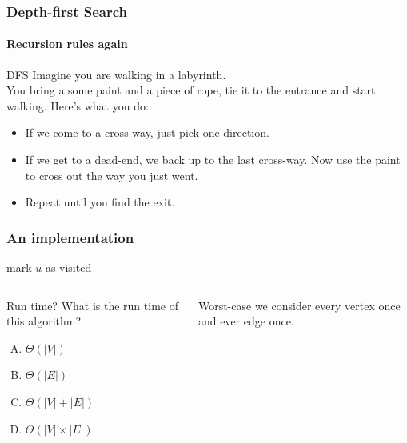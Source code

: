 \begin{frame}
	\frametitle{Depth-first Search}
	\framesubtitle{Recursion rules again}

		\begin{block}{DFS}
			Imagine you are walking in a labyrinth.\\
			\pause
			You bring a some paint and a piece of rope, tie it to the entrance and start walking. Here's what you do:\\
			\pause
			\begin{itemize}
				\item If we come to a cross-way, just pick one direction.
					\pause
				\item If we get to a dead-end, we back up to the last cross-way. Now use the paint to cross out the way you just
					went.
					\pause
				\item Repeat until you find the exit.
			\end{itemize}
		\end{block}	
	
\end{frame}

\begin{frame}
	\frametitle{An implementation}
	
	\begin{algorithmic}
	\pause
	\pause
		\State mark $u$ as visited
	\pause
		\State{}
		\EndIf
		\EndFor
		\EndFunction
	\end{algorithmic}
	\pause
	\begin{columns}
	\begin{block}{Run time?}
		What is the run time of this algorithm?
		\begin{enumerate}[A.]
			\item $\Theta(|V|)$
			\item $\Theta(|E|)$
			\item $\Theta(|V| + |E|)$
			\item $\Theta(|V|\times|E|)$
		\end{enumerate}
	\end{block}
		\pause
		\begin{block}{}
			Worst-case we consider every vertex once and ever edge once.
		\end{block}
	\end{columns}
\end{frame}


